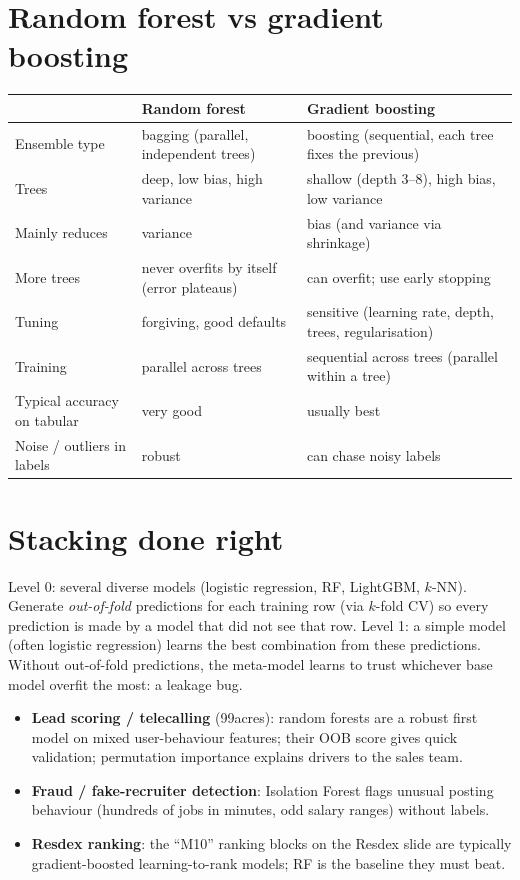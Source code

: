 \section{Random forest vs gradient boosting}
\begin{center}\small
\begin{tabularx}{\linewidth}{l X X}
\toprule
& Random forest & Gradient boosting\\
\midrule
Ensemble type & bagging (parallel, independent trees) & boosting (sequential, each tree fixes the previous)\\
Trees & deep, low bias, high variance & shallow (depth 3--8), high bias, low variance\\
Mainly reduces & variance & bias (and variance via shrinkage)\\
More trees & never overfits by itself (error plateaus) & can overfit; use early stopping\\
Tuning & forgiving, good defaults & sensitive (learning rate, depth, trees, regularisation)\\
Training & parallel across trees & sequential across trees (parallel within a tree)\\
Typical accuracy on tabular & very good & usually best\\
Noise / outliers in labels & robust & can chase noisy labels\\
\bottomrule
\end{tabularx}
\end{center}

\section{Stacking done right}
Level 0: several diverse models (logistic regression, RF, LightGBM, $k$-NN). Generate \emph{out-of-fold} predictions for each
training row (via $k$-fold CV) so every prediction is made by a model that did not see that row. Level 1: a simple model (often
logistic regression) learns the best combination from these predictions. Without out-of-fold predictions, the meta-model learns
to trust whichever base model overfit the most: a leakage bug.

\begin{practical}
\begin{itemize}
\item \textbf{Lead scoring / telecalling} (99acres): random forests are a robust first model on mixed user-behaviour features;
  their OOB score gives quick validation; permutation importance explains drivers to the sales team.
\item \textbf{Fraud / fake-recruiter detection}: Isolation Forest flags unusual posting behaviour (hundreds of jobs in minutes,
  odd salary ranges) without labels.
\item \textbf{Resdex ranking}: the ``M10'' ranking blocks on the Resdex slide are typically gradient-boosted learning-to-rank
  models; RF is the baseline they must beat.
\end{itemize}
\end{practical}

